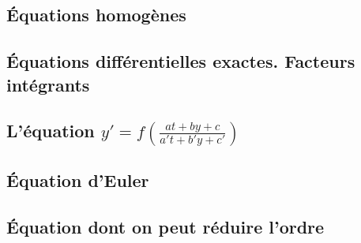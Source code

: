 					\subsection{Équations homogènes}



					\subsection{Équations différentielles exactes. Facteurs intégrants}




					\subsection{L'équation \texorpdfstring{$y'=f\left( \frac{ at+by+c }{ a't+b'y+c' } \right)$}{yat}}


					\subsection{Équation d'Euler}


					\subsection{Équation dont on peut réduire l'ordre}


